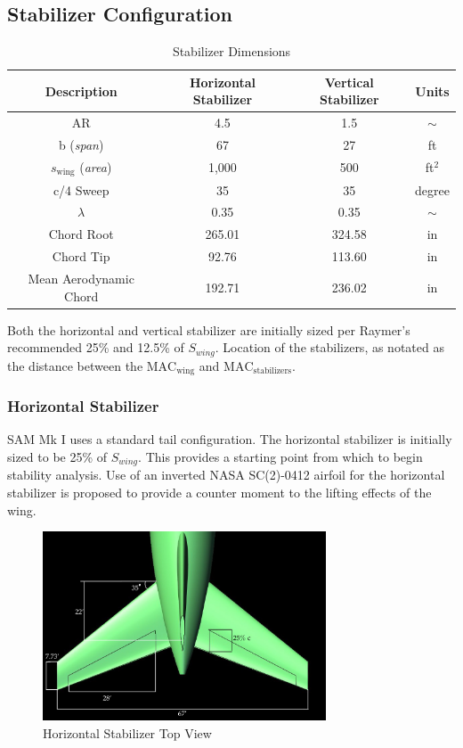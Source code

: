 \subsection{Stabilizer Configuration}

\begin{table}[!h]
    \centering
    \caption{Stabilizer Dimensions}
    \begin{tabular}{|c||c|c|c|} \toprule
        \textbf{Description} & {\textbf{Horizontal Stabilizer}} & 
        {\textbf{Vertical Stabilizer}} & \textbf{Units}\\ \midrule \hline
        AR & 4.5 & 1.5 & $\sim$ \\ \hline
        b (\textit{span}) & 67 & 27 & ft \\ \hline 
        $s_{\text{wing}}$ (\textit{area}) & 1,000 & 500 & ft$^2$ \\ \hline
        c/4 Sweep & 35 & 35 & degree \\ \hline
        $\lambda$ & 0.35 & 0.35 & $\sim$ \\ \hline
        Chord Root & 265.01 & 324.58 & in \\ \hline
        Chord Tip & 92.76 & 113.60 & in \\ \hline   
        Mean Aerodynamic Chord & 192.71 & 236.02 & in \\ \bottomrule
    \end{tabular}
    \label{tab:stabsizing}
\end{table}

Both the horizontal and vertical stabilizer are initially sized per Raymer's recommended 25\% and 12.5\% of $S_{wing}$.\cite{raymer}  Location of the stabilizers, as notated as the distance between the $\text{MAC}_{\text{wing}}$ and $\text{MAC}_{\text{stabilizers}}$.

\subsubsection{Horizontal Stabilizer}
SAM Mk I uses a standard tail configuration.  The horizontal stabilizer is initially sized to be 25\% of $S_{wing}$.  This provides a starting point from which to begin stability analysis.  Use of an inverted NASA SC(2)-0412 airfoil for the horizontal stabilizer is proposed to provide a counter moment to the lifting effects of the wing.
\begin{figure}[!h]
    \centering
    \includegraphics[width=0.75\textwidth]{Photos/stab/htail.jpg}
    \caption{Horizontal Stabilizer Top View}
    \label{fig:htailstab}
\end{figure}

